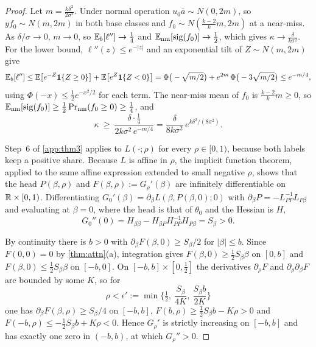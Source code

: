 \begin{proof}
 Let $m=\frac{k\delta^2}{2\sigma^2}$. Under normal operation $u_0\bar a\sim N(0,2m)$, so $yf_0\sim N(m,2m)$ in both base classes and $f_0\sim N(\frac{k-2}{k}m,2m)$ at a near-miss. As $\delta/\sigma\to0$, $m\to0$, so $\mathbb{E}_b[\ell'']\to\frac14$ and $\mathbb{E}_{\mathrm{nm}}[\operatorname{sig}(f_0)]\to\frac12$, which gives $\kappa\to\frac{\delta}{k\sigma^2}$. For the lower bound, $\ell''(z)\le e^{-|z|}$ and an exponential tilt of $Z\sim N(m,2m)$ give
\begin{equation}\label{eq:tilt}
  \mathbb{E}_b[\ell'']\le\mathbb{E}\big[e^{-Z}\mathbf{1}\{Z\ge0\}\big]+\mathbb{E}\big[e^{Z}\mathbf{1}\{Z<0\}\big]
  =\Phi\big(-\sqrt{m/2}\big)+e^{2m}\,\Phi\big(-3\sqrt{m/2}\big)\le e^{-m/4},
\end{equation}
using $\Phi(-x)\le\frac12e^{-x^2/2}$ for each term. The near-miss mean of $f_0$ is $\frac{k-2}{k}m\ge0$, so $\mathbb{E}_{\mathrm{nm}}[\operatorname{sig}(f_0)]\ge\frac12\Pr_{\mathrm{nm}}(f_0\ge0)\ge\frac14$, and
\begin{equation}\label{eq:kappa-lb}
  \kappa\ \ge\ \frac{\delta\cdot\frac14}{2k\sigma^2\,e^{-m/4}}=\frac{\delta}{8k\sigma^2}\,e^{k\delta^2/(8\sigma^2)} .
\end{equation}

 Step~6 of \cref{app:thm3} applies to $L(\cdot;\rho)$ for every $\rho\in[0,1)$, because both labels keep a positive share. Because $L$ is affine in $\rho$, the implicit function theorem, applied to the same affine expression extended to small negative $\rho$, shows that the head $P(\beta,\rho)$ and $F(\beta,\rho):=G_\rho'(\beta)$ are infinitely differentiable on $\mathbb{R}\times[0,1)$. Differentiating $G_0'(\beta)=\partial_\beta L(\beta,P(\beta,0);0)$ with $\partial_\beta P=-L_{PP}^{-1}L_{P\beta}$ and evaluating at $\beta=0$, where the head is that of $\theta_0$ and the Hessian is $H$,
\begin{equation}\label{eq:Gpp}
  \boxed{\;G_0''(0)=H_{\beta\beta}-H_{\beta P}H_{PP}^{-1}H_{P\beta}=S_\beta>0 .\;}
\end{equation}

 By continuity there is $b>0$ with $\partial_\beta F(\beta,0)\ge S_\beta/2$ for $|\beta|\le b$. Since $F(0,0)=0$ by \cref{thm:attn}(a), integration gives $F(\beta,0)\ge\frac12S_\beta\beta$ on $[0,b]$ and $F(\beta,0)\le\frac12S_\beta\beta$ on $[-b,0]$. On $[-b,b]\times[0,\frac12]$ the derivatives $\partial_\rho F$ and $\partial_\rho\partial_\beta F$ are bounded by some $K$, so for
\begin{equation}\label{eq:eps}
  \rho<\epsilon':=\min\Big\{\tfrac12,\ \frac{S_\beta}{4K},\ \frac{S_\beta b}{2K}\Big\}
\end{equation}
one has $\partial_\beta F(\beta,\rho)\ge S_\beta/4$ on $[-b,b]$, $F(b,\rho)\ge\frac12S_\beta b-K\rho>0$ and $F(-b,\rho)\le-\frac12S_\beta b+K\rho<0$. Hence $G_\rho'$ is strictly increasing on $[-b,b]$ and has exactly one zero in $(-b,b)$, at which $G_\rho''>0$.


\end{proof}

